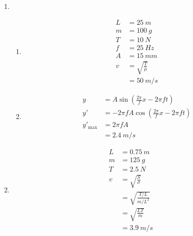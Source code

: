 \documentclass{article}
\begin{document}
\begin{enumerate}
  \item

        \begin{enumerate}
          \item

                \begin{align*}
                  L & = \qty{25}{m}          \\
                  m & = \qty{100}{g}         \\
                  T & = \qty{10}{N}          \\
                  f & = \qty{25}{Hz}         \\
                  A & = \qty{15}{mm}         \\
                  v & = \sqrt{\frac{T}{\mu}} \\
                    & = \qty{50}{m/s}
                \end{align*}

          \item

                \begin{align*}
                  y             & = A \sin \left( \frac{2 \pi}{f} x - 2 \pi f t \right)          \\
                  y'            & = -2 \pi f A \cos \left( \frac{2 \pi}{f} x - 2 \pi f t \right) \\
                  y'_\text{max} & = 2 \pi f A                                                    \\
                                & = \qty{2.4}{m/s}
                \end{align*}
        \end{enumerate}

  \item

        \begin{align*}
          L & = \qty{0.75}{m}                \\
          m & = \qty{125}{g}                 \\
          T & = \qty{2.5}{N}                 \\
          v & = \sqrt{\frac{S}{\sigma}}      \\
            & = \sqrt{\frac{T / L}{m / L^2}} \\
            & = \sqrt{\frac{L T}{m}}         \\
            & = \qty{3.9}{m/s}
        \end{align*}
\end{enumerate}
\end{document}
